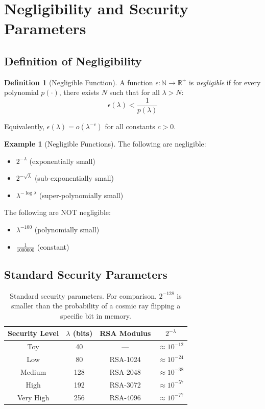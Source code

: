 \documentclass[11pt]{article}
\theoremstyle{definition}
\newtheorem{definition}{Definition}
\newtheorem{example}{Example}
\begin{document}
\section{Negligibility and Security Parameters}

\subsection{Definition of Negligibility}

\begin{definition}[Negligible Function]
A function $\epsilon: \mathbb{N} \to \mathbb{R}^+$ is \emph{negligible} if for every 
polynomial $p(\cdot)$, there exists $N$ such that for all $\lambda > N$:
\[
\epsilon(\lambda) < \frac{1}{p(\lambda)}
\]

Equivalently, $\epsilon(\lambda) = o(\lambda^{-c})$ for all constants $c > 0$.
\end{definition}

\begin{example}[Negligible Functions]
The following are negligible:
\begin{itemize}
\item $2^{-\lambda}$ (exponentially small)
\item $2^{-\sqrt{\lambda}}$ (sub-exponentially small)
\item $\lambda^{-\log \lambda}$ (super-polynomially small)
\end{itemize}
The following are NOT negligible:
\begin{itemize}
\item $\lambda^{-100}$ (polynomially small)
\item $\frac{1}{1000000}$ (constant)
\end{itemize}
\end{example}

\subsection{Standard Security Parameters}

\begin{table}[h]
\centering
\begin{tabular}{@{}cccc@{}}
\toprule
\textbf{Security Level} & \textbf{$\lambda$ (bits)} & \textbf{RSA Modulus} & \textbf{$2^{-\lambda}$} \\ 
\midrule
Toy & 40 & --- & $\approx 10^{-12}$ \\
Low & 80 & RSA-1024 & $\approx 10^{-24}$ \\
Medium & 128 & RSA-2048 & $\approx 10^{-38}$ \\
High & 192 & RSA-3072 & $\approx 10^{-57}$ \\
Very High & 256 & RSA-4096 & $\approx 10^{-77}$ \\
\bottomrule
\end{tabular}
\caption{Standard security parameters. For comparison, $2^{-128}$ is smaller than 
the probability of a cosmic ray flipping a specific bit in memory.}
\end{table}
\end{document}
